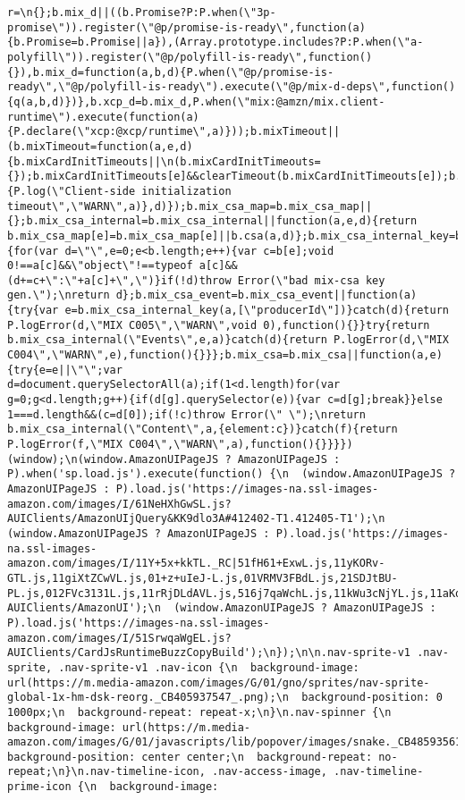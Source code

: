 \documentclass[
]{article}
\begin{document}
\begin{verbatim}
r=\n{};b.mix_d||((b.Promise?P:P.when(\"3p-promise\")).register(\"@p/promise-is-ready\",function(a){b.Promise=b.Promise||a}),(Array.prototype.includes?P:P.when(\"a-polyfill\")).register(\"@p/polyfill-is-ready\",function(){}),b.mix_d=function(a,b,d){P.when(\"@p/promise-is-ready\",\"@p/polyfill-is-ready\").execute(\"@p/mix-d-deps\",function(){q(a,b,d)})},b.xcp_d=b.mix_d,P.when(\"mix:@amzn/mix.client-runtime\").execute(function(a){P.declare(\"xcp:@xcp/runtime\",a)}));b.mixTimeout||(b.mixTimeout=function(a,e,d){b.mixCardInitTimeouts||\n(b.mixCardInitTimeouts={});b.mixCardInitTimeouts[e]&&clearTimeout(b.mixCardInitTimeouts[e]);b.mixCardInitTimeouts[e]=setTimeout(function(){P.log(\"Client-side initialization timeout\",\"WARN\",a)},d)});b.mix_csa_map=b.mix_csa_map||{};b.mix_csa_internal=b.mix_csa_internal||function(a,e,d){return b.mix_csa_map[e]=b.mix_csa_map[e]||b.csa(a,d)};b.mix_csa_internal_key=b.mix_csa_internal_key||function(a,b){for(var d=\"\",e=0;e<b.length;e++){var c=b[e];void 0!==a[c]&&\"object\"!==typeof a[c]&&(d+=c+\":\"+a[c]+\",\")}if(!d)throw Error(\"bad mix-csa key gen.\");\nreturn d};b.mix_csa_event=b.mix_csa_event||function(a){try{var e=b.mix_csa_internal_key(a,[\"producerId\"])}catch(d){return P.logError(d,\"MIX C005\",\"WARN\",void 0),function(){}}try{return b.mix_csa_internal(\"Events\",e,a)}catch(d){return P.logError(d,\"MIX C004\",\"WARN\",e),function(){}}};b.mix_csa=b.mix_csa||function(a,e){try{e=e||\"\";var d=document.querySelectorAll(a);if(1<d.length)for(var g=0;g<d.length;g++){if(d[g].querySelector(e)){var c=d[g];break}}else 1===d.length&&(c=d[0]);if(!c)throw Error(\" \");\nreturn b.mix_csa_internal(\"Content\",a,{element:c})}catch(f){return P.logError(f,\"MIX C004\",\"WARN\",a),function(){}}}})(window);\n(window.AmazonUIPageJS ? AmazonUIPageJS : P).when('sp.load.js').execute(function() {\n  (window.AmazonUIPageJS ? AmazonUIPageJS : P).load.js('https://images-na.ssl-images-amazon.com/images/I/61NeHXhGwSL.js?AUIClients/AmazonUIjQuery&KK9dlo3A#412402-T1.412405-T1');\n  (window.AmazonUIPageJS ? AmazonUIPageJS : P).load.js('https://images-na.ssl-images-amazon.com/images/I/11Y+5x+kkTL._RC|51fH61+ExwL.js,11yKORv-GTL.js,11giXtZCwVL.js,01+z+uIeJ-L.js,01VRMV3FBdL.js,21SDJtBU-PL.js,012FVc3131L.js,11rRjDLdAVL.js,516j7qaWchL.js,11kWu3cNjYL.js,11aKqyRXooL.js,11OREnu1epL.js,11qVTZscrRL.js,21ssiLNIZvL.js,0190vxtlzcL.js,51+N26vFcBL.js,01JYHc2oIlL.js,31nfKXylf6L.js,01ezj5Rkz1L.js,11bEz2VIYrL.js,31o2NGTXThL.js,01rpauTep4L.js,01wGRCg6A5L.js_.js?AUIClients/AmazonUI');\n  (window.AmazonUIPageJS ? AmazonUIPageJS : P).load.js('https://images-na.ssl-images-amazon.com/images/I/51SrwqaWgEL.js?AUIClients/CardJsRuntimeBuzzCopyBuild');\n});\n\n.nav-sprite-v1 .nav-sprite, .nav-sprite-v1 .nav-icon {\n  background-image: url(https://m.media-amazon.com/images/G/01/gno/sprites/nav-sprite-global-1x-hm-dsk-reorg._CB405937547_.png);\n  background-position: 0 1000px;\n  background-repeat: repeat-x;\n}\n.nav-spinner {\n  background-image: url(https://m.media-amazon.com/images/G/01/javascripts/lib/popover/images/snake._CB485935611_.gif);\n  background-position: center center;\n  background-repeat: no-repeat;\n}\n.nav-timeline-icon, .nav-access-image, .nav-timeline-prime-icon {\n  background-image: 
\end{verbatim}
\end{document}
